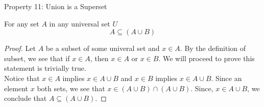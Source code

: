 \newpage
\begin{theorem}
Property 11: Union is a Superset  \\
    \begin{tcolorbox}
        For any set $A$ in any universal set $U$
            \begin{equation*}
                A \subseteq (A \cup B)
            \end{equation*}
    \end{tcolorbox}

    \begin{proof}
        Let $A$ be a subset of some univeral set and $x \in A$. By the definition of subset, we see that if $x \in A$, then $x \in A$ or $x \in B$. We will proceed to prove this statement is trivially true. \\
        Notice that $x \in A$ implies $x \in A \cup B$ and $x \in B$ implies $x \in A \cup B$. Since an element $x$ both sets, we see that $x \in  (A \cup B) \cap (A \cup B)$. Since, $x \in A \cup B$, we conclude that $A \subseteq (A \cup B)$.
    \end{proof}
\end{theorem}









